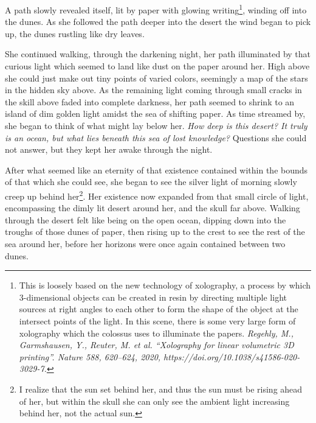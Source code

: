 \documentclass[12pt]{article}
\begin{document}
\begin{flushleft}
A path slowly revealed itself, lit by paper with glowing writing\footnote{This is loosely based on the new technology of xolography, a process by which 3-dimensional objects can be created in resin by directing multiple light sources at right angles to each other to form the shape of the object at the intersect points of the light. In this scene, there is some very large form of xolography which the colossus uses to illuminate the papers.\linebreak
\textit{Regehly, M., Garmshausen, Y., Reuter, M. et al. “Xolography for linear volumetric 3D printing”. Nature 588, 620–624, 2020, https://doi.org/10.1038/s41586-020-3029-7.}}, winding off into the dunes. As she followed the path deeper into the desert the wind began to pick up, the dunes rustling like dry leaves.

She continued walking, through the darkening night, her path illuminated by that curious light which seemed to land like dust on the paper around her. High above she could just make out tiny points of varied colors, seemingly a map of the stars in the hidden sky above. As the remaining light coming through small cracks in the skill above faded into complete darkness, her path seemed to shrink to an island of dim golden light amidst the sea of shifting paper. As time streamed by, she began to think of what might lay below her. \textit{How deep is this desert? It truly is an ocean, but what lies beneath this sea of lost knowledge?} Questions she could not answer, but they kept her awake through the night.

After what seemed like an eternity of that existence contained within the bounds of that which she could see, she began to see the silver light of morning slowly creep up behind her\footnote{I realize that the sun set behind her, and thus the sun must be rising ahead of her, but within the skull she can only see the ambient light increasing behind her, not the actual sun.}. Her existence now expanded from that small circle of light, encompassing the dimly lit desert around her, and the skull far above. Walking through the desert felt like being on the open ocean, dipping down into the troughs of those dunes of paper, then rising up to the crest to see the rest of the sea around her, before her horizons were once again contained between two dunes.


\end{flushleft}
\end{document}
